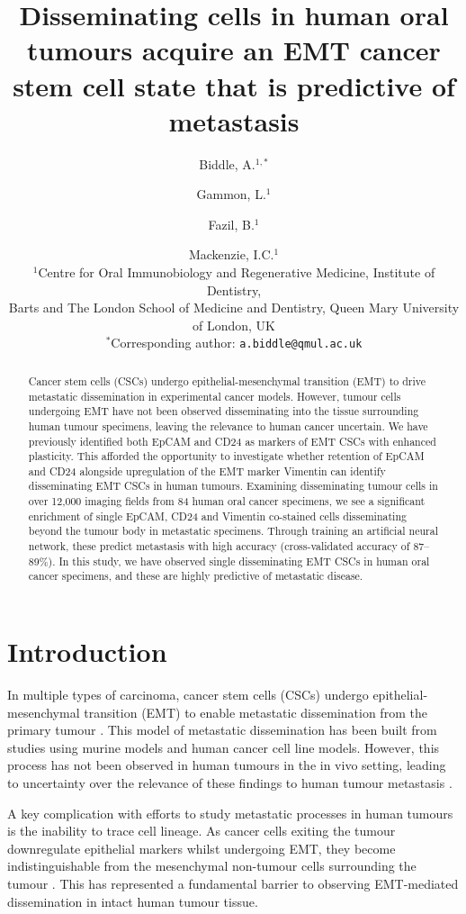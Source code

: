 \documentclass[11pt]{article}
\title{Disseminating cells in human oral tumours acquire an EMT cancer stem cell state that is predictive of metastasis}
\author{
Biddle, A.$^{1,*}$ \and Gammon, L.$^{1}$ \and Fazil, B.$^{1}$ \and Mackenzie, I.C.$^{1}$\\[6pt]
\small $^{1}$Centre for Oral Immunobiology and Regenerative Medicine, Institute of Dentistry,\\
\small Barts and The London School of Medicine and Dentistry, Queen Mary University of London, UK\\
\small $^{*}$Corresponding author: \texttt{a.biddle@qmul.ac.uk}
}
\date{}
\begin{document}
\maketitle

\begin{abstract}
Cancer stem cells (CSCs) undergo epithelial-mesenchymal transition (EMT) to drive metastatic dissemination in experimental cancer models. However, tumour cells undergoing EMT have not been observed disseminating into the tissue surrounding human tumour specimens, leaving the relevance to human cancer uncertain. We have previously identified both EpCAM and CD24 as markers of EMT CSCs with enhanced plasticity. This afforded the opportunity to investigate whether retention of EpCAM and CD24 alongside upregulation of the EMT marker Vimentin can identify disseminating EMT CSCs in human tumours. Examining disseminating tumour cells in over 12,000 imaging fields from 84 human oral cancer specimens, we see a significant enrichment of single EpCAM, CD24 and Vimentin co-stained cells disseminating beyond the tumour body in metastatic specimens. Through training an artificial neural network, these predict metastasis with high accuracy (cross-validated accuracy of 87--89\%). In this study, we have observed single disseminating EMT CSCs in human oral cancer specimens, and these are highly predictive of metastatic disease.
\end{abstract}

\section{Introduction}

In multiple types of carcinoma, cancer stem cells (CSCs) undergo epithelial-mesenchymal transition (EMT) to enable metastatic dissemination from the primary tumour \citep{biddle2011, liu2014, lawson2015}. This model of metastatic dissemination has been built from studies using murine models and human cancer cell line models. However, this process has not been observed in human tumours in the in vivo setting, leading to uncertainty over the relevance of these findings to human tumour metastasis \citep{bill2015, williams2019}.

A key complication with efforts to study metastatic processes in human tumours is the inability to trace cell lineage. As cancer cells exiting the tumour downregulate epithelial markers whilst undergoing EMT, they become indistinguishable from the mesenchymal non-tumour cells surrounding the tumour \citep{li2016}. This has represented a fundamental barrier to observing EMT-mediated dissemination in intact human tumour tissue.
\end{document}
